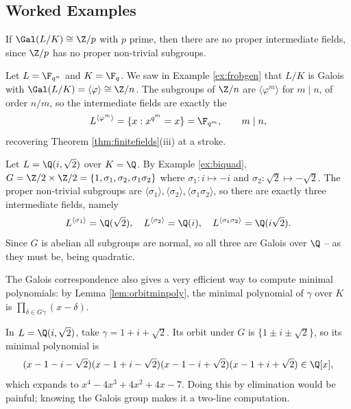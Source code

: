 \subsection{Worked Examples}

\begin{example}
	If $\Gal(L/K) \cong \Z/p$ with $p$ prime, then there are no proper intermediate fields, since $\Z/p$ has no proper non-trivial subgroups.
\end{example}

\begin{example}
	Let $L = \F_{q^n}$ and $K = \F_q$. We saw in Example \ref{ex:frobgen} that $L/K$ is Galois with $\Gal(L/K) = \langle\varphi\rangle \cong \Z/n$. The subgroups of $\Z/n$ are $\langle \varphi^m\rangle$ for $m \mid n$, of order $n/m$, so the intermediate fields are exactly the
	$$L^{\langle\varphi^m\rangle} = \{x : x^{q^m} = x\} = \F_{q^m}, \qquad m \mid n,$$
	recovering Theorem \ref{thm:finitefields}(iii) at a stroke.
\end{example}

\begin{example}
	Let $L = \Q(i,\sqrt2)$ over $K = \Q$. By Example \ref{ex:biquad}, $G = \Z/2\times\Z/2 = \{1,\sigma_1,\sigma_2,\sigma_1\sigma_2\}$ where $\sigma_1 : i \mapsto -i$ and $\sigma_2 : \sqrt2 \mapsto -\sqrt2$. The proper non-trivial subgroups are $\langle\sigma_1\rangle, \langle\sigma_2\rangle, \langle\sigma_1\sigma_2\rangle$, so there are exactly three intermediate fields, namely
	$$L^{\langle\sigma_1\rangle} = \Q(\sqrt 2), \quad L^{\langle\sigma_2\rangle} = \Q(i), \quad L^{\langle\sigma_1\sigma_2\rangle} = \Q(i\sqrt 2).$$
	Since $G$ is abelian all subgroups are normal, so all three are Galois over $\Q$ -- as they must be, being quadratic.
\end{example}

The Galois correspondence also gives a very efficient way to compute minimal polynomials: by Lemma \ref{lem:orbitminpoly}, the minimal polynomial of $\gamma$ over $K$ is $\prod_{\delta \in G\gamma}(x - \delta)$.

\begin{example}
	In $L = \Q(i,\sqrt2)$, take $\gamma = 1 + i + \sqrt 2$. Its orbit under $G$ is $\{1 \pm i \pm \sqrt 2\}$, so its minimal polynomial is
	$$(x-1-i-\sqrt2)(x-1+i-\sqrt2)(x-1-i+\sqrt2)(x-1+i+\sqrt2) \in \Q[x],$$
	which expands to $x^4 - 4x^3 + 4x^2 + 4x - 7$. Doing this by elimination would be painful; knowing the Galois group makes it a two-line computation.
\end{example}

